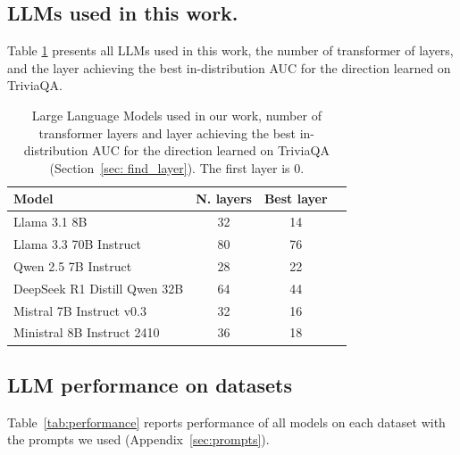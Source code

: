\documentclass{article} %
\begin{document}
\subsection{LLMs used in this work.}

Table \ref{tab:LLMs} presents all LLMs used in this work, the number of transformer of layers, and the layer achieving the best in-distribution AUC for the direction learned on TriviaQA.

\begin{table}[]
    \centering
        \caption{Large Language Models used in our work, number of transformer layers and layer achieving the best in-distribution AUC for the direction learned on TriviaQA (Section~\ref{sec: find_layer}). The first layer is 0.}
    \label{tab:LLMs}
    \begin{tabular}{lccc}
    \toprule
         \textbf{Model} & \textbf{N. layers} & \textbf{Best layer} \\
         \midrule
         Llama 3.1 8B & 32 & 14 \\ %
         Llama 3.3 70B Instruct & 80 & 76 \\ %
         Qwen 2.5 7B Instruct & 28 & 22 \\ %
         DeepSeek R1 Distill Qwen 32B & 64 & 44 \\ %
         Mistral 7B Instruct v0.3 & 32 & 16 \\ %
         Ministral 8B Instruct 2410 & 36 & 18 \\ %
         \bottomrule
    \end{tabular}
\end{table}

\subsection{LLM performance on datasets}\label{sec:performance}

Table~\ref{tab:performance} reports performance of all models on each dataset with the prompts we used (Appendix~\ref{sec:prompts}).
\end{document}

